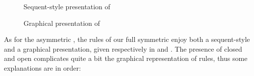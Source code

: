 %   

\begin{figure*}
  
  \caption{Sequent-style presentation of }
\end{figure*}

\begin{figure*}
  
  \caption{Graphical presentation of }
\end{figure*}

As for the asymmetric  , the rules of our full symmetric
  enjoy both a sequent-style and a graphical
presentation, given respectively in  and .
The presence of closed and open  complicates quite a bit the graphical
representation of rules, thus some explanations are in order:
